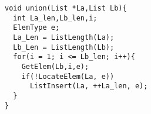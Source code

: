 \begin{lstlisting}[frame=tb,backgroundcolor=\color{red!10}]
void union(List *La,List Lb){
  int La_len,Lb_len,i;
  ElemType e;
  La_Len = ListLength(La);
  Lb_Len = ListLength(Lb);
  for(i = 1; i <= Lb_len; i++){
    GetElem(Lb,i,e);
    if(!LocateElem(La, e))
      ListInsert(La, ++La_len, e);
  }
} 
\end{lstlisting}
